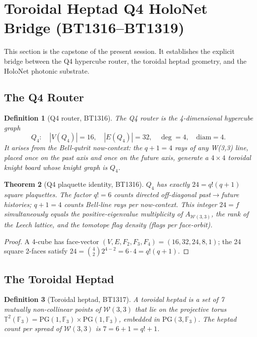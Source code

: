 \documentclass[12pt,a4paper]{article}
\newtheorem{theorem}{Theorem}[section]
\newtheorem{definition}[theorem]{Definition}
\newcommand{\W}{\mathcal{W}(3,3)}
\newcommand{\F}{\mathbb{F}}
\begin{document}
\section{Toroidal Heptad Q4 HoloNet Bridge (BT1316--BT1319)}

This section is the capstone of the present session. It establishes
the explicit bridge between the Q4 hypercube router, the toroidal
heptad geometry, and the HoloNet photonic substrate.

\subsection{The Q4 Router}

\begin{definition}[Q4 router, BT1316]
  The \emph{Q4 router} is the 4-dimensional hypercube graph
  \[
    Q_4:\quad |V(Q_4)|=16,\quad |E(Q_4)|=32,\quad \deg=4,\quad \mathrm{diam}=4.
  \]
  It arises from the Bell-qutrit now-context: the $q+1=4$ rays of any
  W(3,3) line, placed once on the past axis and once on the future axis,
  generate a $4\times 4$ toroidal knight board whose knight graph is $Q_4$.
\end{definition}

\begin{theorem}[Q4 plaquette identity, BT1316]
  $Q_4$ has exactly $24 = q!(q+1)$ square plaquettes. The
  factor $q!=6$ counts directed off-diagonal past$\to$future histories;
  $q+1=4$ counts Bell-line rays per now-context. This integer $24=f$
  simultaneously equals the positive-eigenvalue multiplicity of $A_{\W}$,
  the rank of the Leech lattice, and the tomotope flag density
  (flags per face-orbit).
\end{theorem}

\begin{proof}
  A 4-cube has face-vector $(V,E,F_2,F_3,F_4)=(16,32,24,8,1)$;
  the 24 square 2-faces satisfy $24=\binom{4}{2}2^{4-2}=6\cdot 4=q!(q+1)$.\checkmark
\end{proof}

\subsection{The Toroidal Heptad}

\begin{definition}[Toroidal heptad, BT1317]
  A \emph{toroidal heptad} is a set of 7 mutually non-collinear points
  of $\W$ that lie on the projective torus
  $\mathbb{T}^2(\F_3)=\mathrm{PG}(1,\F_3)\times\mathrm{PG}(1,\F_3)$,
  embedded in $\mathrm{PG}(3,\F_3)$.
  The heptad count per spread of $\W$ is $7 = 6+1 = q!+1$.
\end{definition}
\end{document}
